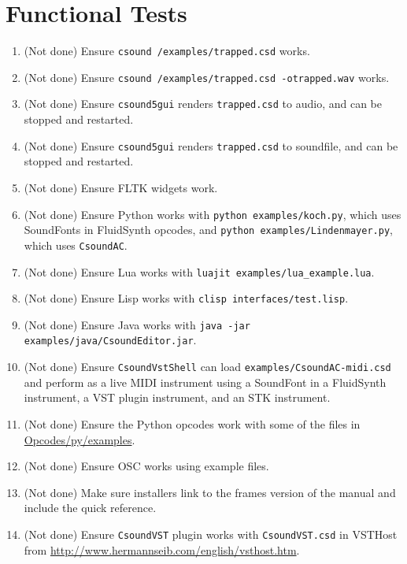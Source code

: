 \documentclass[11pt,letterpaper,onecolumn]{scrartcl}
\begin{document}
\begin{sloppypar}
\section{Functional Tests}
\label{sec:FunctionalTests}

\begin{enumerate}
	\item (Not done) Ensure \texttt{csound /examples/trapped.csd} works.
	\item (Not done) Ensure \texttt{csound /examples/trapped.csd -otrapped.wav} works.
	\item (Not done) Ensure \texttt{csound5gui} renders \texttt{trapped.csd} to audio, and can be stopped and restarted.
	\item (Not done) Ensure \texttt{csound5gui} renders \texttt{trapped.csd} to soundfile, and can be stopped and restarted. 	
	\item (Not done) Ensure FLTK widgets work. 	
	\item (Not done) Ensure Python works with \texttt{python examples/koch.py}, which uses SoundFonts in FluidSynth opcodes, and \texttt{python examples/Lindenmayer.py}, which uses \texttt{CsoundAC}. 
	\item (Not done) Ensure Lua works with \verb|luajit examples/lua_example.lua|.
	\item (Not done) Ensure Lisp works with \verb|clisp interfaces/test.lisp|.
	\item (Not done) Ensure Java works with \verb|java -jar examples/java/CsoundEditor.jar|.
	\item (Not done) Ensure \texttt{CsoundVstShell} can load \texttt{examples/CsoundAC-midi.csd} and perform as a live MIDI instrument using a SoundFont in a FluidSynth instrument, a VST plugin instrument, and an STK instrument.
	\item (Not done) Ensure the Python opcodes work with some of the files in \url{Opcodes/py/examples}.
	\item (Not done) Ensure OSC works using example files.
	\item (Not done) Make sure installers link to the frames version of the manual and include the quick reference.
	\item (Not done) Ensure \texttt{CsoundVST} plugin works with \texttt{CsoundVST.csd} in VSTHost from \url{http://www.hermannseib.com/english/vsthost.htm}.
\end{enumerate}

\end{sloppypar}
\end{document}
